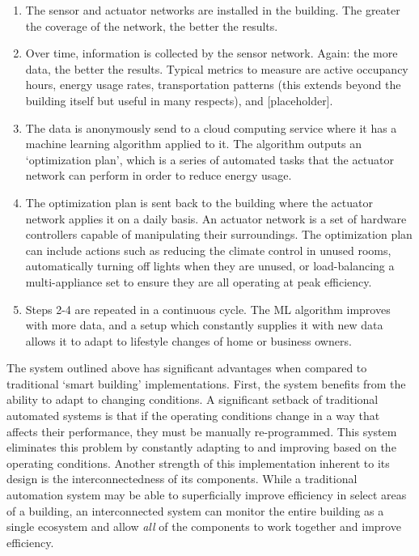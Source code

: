 \documentclass[letterpaper]{article}
\begin{document}
\begin{center}
\begin{enumerate}
\item
    The sensor and actuator networks are installed in the building. The greater the coverage of the network, the better the results.
\item
    Over time, information is collected by the sensor network. Again: the more data, the better the results. Typical metrics to measure are active occupancy hours, energy usage rates, transportation patterns (this extends beyond the building itself but useful in many respects), and [placeholder].
\item
    The data is anonymously send to a cloud computing service where it has a machine learning algorithm applied to it. The algorithm outputs an `optimization plan', which is a series of automated tasks that the actuator network can perform in order to reduce energy usage.
\item
    The optimization plan is sent back to the building where the actuator network applies it on a daily basis. An actuator network is a set of hardware controllers capable of manipulating their surroundings. The optimization plan can include actions such as reducing the climate control in unused rooms, automatically turning off lights when they are unused, or load-balancing a multi-appliance set to ensure they are all operating at peak efficiency.
\item
    Steps 2-4 are repeated in a continuous cycle. The ML algorithm improves with more data, and a setup which constantly supplies it with new data allows it to adapt to lifestyle changes of home or business owners.
\end{enumerate}
\end{center}

The system outlined above has significant advantages when compared to traditional `smart building' implementations. First, the system benefits from the ability to adapt to changing conditions. A significant setback of traditional automated systems is that if the operating conditions change in a way that affects their performance, they must be manually re-programmed. This system eliminates this problem by constantly adapting to and improving based on the operating conditions. Another strength of this implementation inherent to its design is the interconnectedness of its components. While a traditional automation system may be able to superficially improve efficiency in select areas of a building, an interconnected system can monitor the entire building as a single ecosystem and allow \emph{all} of the components to work together and improve efficiency.
\end{document}
